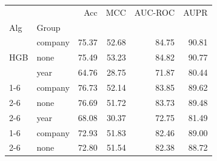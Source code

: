\begin{table}
\centering
\begin{tabular}{llrrrr}
\toprule
 &  & Acc & MCC & AUC-ROC & AUPR \\
Alg & Group &  &  &  &  \\
\midrule
\multirow[c]{3}{*}{HGB} & company & {\cellcolor[HTML]{952F03}} \color[HTML]{F1F1F1} 75.37 & {\cellcolor[HTML]{842904}} \color[HTML]{F1F1F1} 52.68 & {\cellcolor[HTML]{802704}} \color[HTML]{F1F1F1} 84.75 & {\cellcolor[HTML]{7F2704}} \color[HTML]{F1F1F1} 90.81 \\
\cline{2-6}
 & none & {\cellcolor[HTML]{942F03}} \color[HTML]{F1F1F1} 75.49 & {\cellcolor[HTML]{7F2704}} \color[HTML]{F1F1F1} 53.23 & {\cellcolor[HTML]{7F2704}} \color[HTML]{F1F1F1} 84.82 & {\cellcolor[HTML]{7F2704}} \color[HTML]{F1F1F1} 90.77 \\
\cline{2-6}
 & year & {\cellcolor[HTML]{FDB475}} \color[HTML]{000000} 64.76 & {\cellcolor[HTML]{FDD1A4}} \color[HTML]{000000} 28.75 & {\cellcolor[HTML]{FEE1C4}} \color[HTML]{000000} 71.87 & {\cellcolor[HTML]{FEEAD6}} \color[HTML]{000000} 80.44 \\
\cline{1-6} \cline{2-6}
\multirow[c]{3}{*}{RF} & company & {\cellcolor[HTML]{7F2704}} \color[HTML]{F1F1F1} 76.73 & {\cellcolor[HTML]{892B04}} \color[HTML]{F1F1F1} 52.14 & {\cellcolor[HTML]{932F03}} \color[HTML]{F1F1F1} 83.85 & {\cellcolor[HTML]{9F3303}} \color[HTML]{F1F1F1} 89.62 \\
\cline{2-6}
 & none & {\cellcolor[HTML]{7F2704}} \color[HTML]{F1F1F1} 76.69 & {\cellcolor[HTML]{8C2C04}} \color[HTML]{F1F1F1} 51.72 & {\cellcolor[HTML]{952F03}} \color[HTML]{F1F1F1} 83.73 & {\cellcolor[HTML]{A23503}} \color[HTML]{F1F1F1} 89.48 \\
\cline{2-6}
 & year & {\cellcolor[HTML]{FA8331}} \color[HTML]{F1F1F1} 68.08 & {\cellcolor[HTML]{FDC48F}} \color[HTML]{000000} 30.37 & {\cellcolor[HTML]{FDD7AF}} \color[HTML]{000000} 72.75 & {\cellcolor[HTML]{FEDCB9}} \color[HTML]{000000} 81.49 \\
\cline{1-6} \cline{2-6}
\multirow[c]{3}{*}{SVM} & company & {\cellcolor[HTML]{C64102}} \color[HTML]{F1F1F1} 72.93 & {\cellcolor[HTML]{8C2C04}} \color[HTML]{F1F1F1} 51.83 & {\cellcolor[HTML]{B13A03}} \color[HTML]{F1F1F1} 82.46 & {\cellcolor[HTML]{B33B02}} \color[HTML]{F1F1F1} 89.00 \\
\cline{2-6}
 & none & {\cellcolor[HTML]{C94202}} \color[HTML]{F1F1F1} 72.80 & {\cellcolor[HTML]{8F2D04}} \color[HTML]{F1F1F1} 51.54 & {\cellcolor[HTML]{B33B02}} \color[HTML]{F1F1F1} 82.38 & {\cellcolor[HTML]{BD3E02}} \color[HTML]{F1F1F1} 88.72 \\

\end{tabular}
\end{table}
